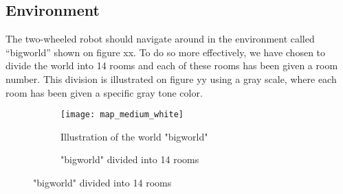 \documentclass[../Head/Main.tex]{subfiles}
\begin{document}
\subsection{Environment}
The two-wheeled robot should navigate around in the environment called “bigworld” shown on figure {\color{red} xx}. To do so more effectively, we have chosen to divide the world into 14 rooms and each of these rooms has been given a room number. This division is illustrated on figure {\color{red} yy} using a gray scale, where each room has been given a specific gray tone color.
\begin{figure}[H]
	\centering
	\begin{subfigure}[b]{0.49\textwidth}
		\centering
		\texttt{[image: map\_medium\_white]}
		\caption{Illustration of the world "bigworld"}
	\end{subfigure}
	\hfill	
	\begin{subfigure}[b]{0.49\textwidth}
		\centering
		\caption{"bigworld" divided into 14 rooms}
	\end{subfigure}
\end{figure}
\end{document}
